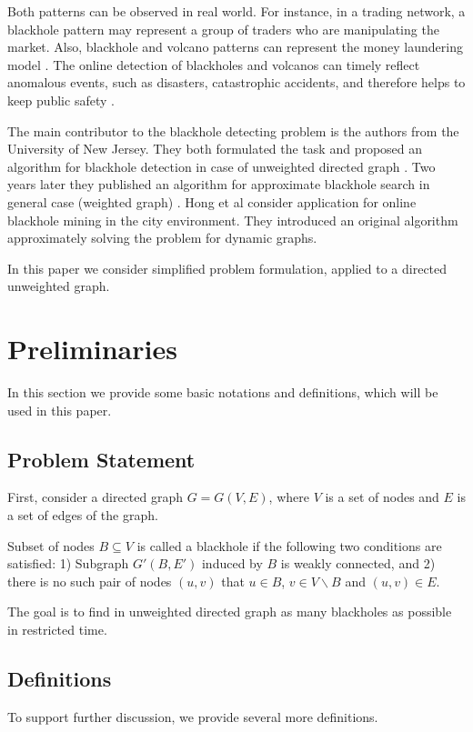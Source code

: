 \documentclass{svproc}
\begin{document}
Both patterns can be observed in real world.
For instance, in a trading network, a blackhole pattern may represent a group of traders who are
manipulating the market. Also, blackhole and volcano patterns can represent the money laundering model \cite{semenov2017survey}.
The online detection of blackholes and volcanos can timely 
reflect anomalous events, such as disasters, catastrophic accidents, and therefore helps to keep public safety \cite{hong2015detecting}.

The main contributor to the blackhole detecting problem is the authors from the University of New Jersey. They both formulated the task and proposed an algorithm for blackhole detection in case of unweighted directed graph \cite{li2010detecting}. 
Two years later they published an algorithm for approximate blackhole search in general case (weighted graph) \cite{li2012mining,li2014mining}. 
Hong et al \cite{hong2015detecting} consider application for online blackhole mining in the city environment. They introduced an original algorithm approximately solving the problem for dynamic graphs.  

In this paper we consider simplified problem formulation, applied to a directed unweighted graph.

\section{Preliminaries}
In this section we provide some basic notations and definitions, which will be used in this paper. 

\subsection{Problem Statement} 
First, consider a directed graph $G = G(V,E)$, where $V$ is a set of nodes and $E$ is a set of edges of the graph. 

\begin{definition}
Subset of nodes $B \subseteq V$ is called a blackhole if  the following two conditions are satisfied: 
1) Subgraph $G'(B, E')$ induced by $B$ is weakly connected, 
and
2) there is no such pair of nodes $(u,v)$ that $u \in B$, $v \in V \backslash B$ and $(u,v) \in E$.
\end{definition}

The goal is to find in unweighted directed graph as many blackholes as possible in restricted time.

\subsection{Definitions}
To support further discussion, we provide several more definitions.
\end{document}
